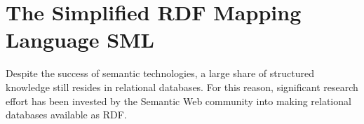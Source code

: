 
\section{The Simplified RDF Mapping Language SML}

Despite the success of semantic technologies, a large share of structured knowledge still resides in relational databases.
For this reason, significant research effort has been invested by the Semantic Web community into making relational databases available as RDF.


